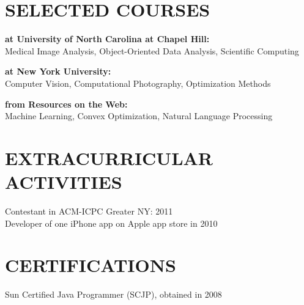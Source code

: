 \documentclass{res}
\begin{document}
\begin{resume}
\section{SELECTED COURSES}      
     \vspace{-0.05in}	    
    \begin{tabbing}
    {\bf at University of North Carolina at Chapel Hill:}\\
    Medical Image Analysis, Object-Oriented Data Analysis, Scientific Computing \\
    \end{tabbing}\vspace{-30pt}
         \begin{tabbing}
    {\bf at New York University:}\\
    Computer Vision, Computational Photography, Optimization Methods\\
        \end{tabbing}\vspace{-30pt}
         \begin{tabbing}
    {\bf from Resources on the Web:}\\
    Machine Learning, Convex Optimization, Natural Language Processing 
            \end{tabbing}


\section{EXTRACURRICULAR ACTIVITIES}       
    \vspace{0.05in}   
    Contestant in ACM-ICPC Greater NY: 2011\\
    Developer of one iPhone app on Apple app store in 2010
    
 \section{CERTIFICATIONS}          
  \vspace{0.05in}
    Sun Certified Java Programmer (SCJP), obtained in 2008\\
  
\end{resume}
\end{document}
